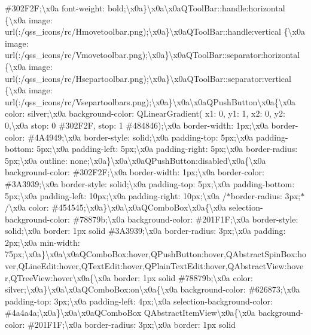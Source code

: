\#302\+F2\+F;\textbackslash{}x0a font-\/weight\+: bold;\textbackslash{}x0a\}\textbackslash{}x0a\textbackslash{}x0a\+Q\+Tool\+Bar\+::handle\+:horizontal \{\textbackslash{}x0a image\+: url(\+:/qss\+\_\+icons/rc/\+Hmovetoolbar.\+png);\textbackslash{}x0a\}\textbackslash{}x0a\+Q\+Tool\+Bar\+::handle\+:vertical \{\textbackslash{}x0a image\+: url(\+:/qss\+\_\+icons/rc/\+Vmovetoolbar.\+png);\textbackslash{}x0a\}\textbackslash{}x0a\+Q\+Tool\+Bar\+::separator\+:horizontal \{\textbackslash{}x0a image\+: url(\+:/qss\+\_\+icons/rc/\+Hsepartoolbar.\+png);\textbackslash{}x0a\}\textbackslash{}x0a\+Q\+Tool\+Bar\+::separator\+:vertical \{\textbackslash{}x0a image\+: url(\+:/qss\+\_\+icons/rc/\+Vsepartoolbars.\+png);\textbackslash{}x0a\}\textbackslash{}x0a\textbackslash{}x0a\+Q\+Push\+Button\textbackslash{}x0a\{\textbackslash{}x0a color\+: silver;\textbackslash{}x0a background-\/color\+: Q\+Linear\+Gradient( x1\+: 0, y1\+: 1, x2\+: 0, y2\+: 0,\textbackslash{}x0a stop\+: 0 \#302\+F2\+F, stop\+: 1 \#484846);\textbackslash{}x0a border-\/width\+: 1px;\textbackslash{}x0a border-\/color\+: \#4\+A4949;\textbackslash{}x0a border-\/style\+: solid;\textbackslash{}x0a padding-\/top\+: 5px;\textbackslash{}x0a padding-\/bottom\+: 5px;\textbackslash{}x0a padding-\/left\+: 5px;\textbackslash{}x0a padding-\/right\+: 5px;\textbackslash{}x0a border-\/radius\+: 5px;\textbackslash{}x0a outline\+: none;\textbackslash{}x0a\}\textbackslash{}x0a\textbackslash{}x0a\+Q\+Push\+Button\+:disabled\textbackslash{}x0a\{\textbackslash{}x0a background-\/color\+: \#302\+F2\+F;\textbackslash{}x0a border-\/width\+: 1px;\textbackslash{}x0a border-\/color\+: \#3\+A3939;\textbackslash{}x0a border-\/style\+: solid;\textbackslash{}x0a padding-\/top\+: 5px;\textbackslash{}x0a padding-\/bottom\+: 5px;\textbackslash{}x0a padding-\/left\+: 10px;\textbackslash{}x0a padding-\/right\+: 10px;\textbackslash{}x0a /$\ast$border-\/radius\+: 3px;$\ast$/\textbackslash{}x0a color\+: \#454545;\textbackslash{}x0a\}\textbackslash{}x0a\textbackslash{}x0a\+Q\+Combo\+Box\textbackslash{}x0a\{\textbackslash{}x0a selection-\/background-\/color\+: \#78879b;\textbackslash{}x0a background-\/color\+: \#201\+F1\+F;\textbackslash{}x0a border-\/style\+: solid;\textbackslash{}x0a border\+: 1px solid \#3\+A3939;\textbackslash{}x0a border-\/radius\+: 3px;\textbackslash{}x0a padding\+: 2px;\textbackslash{}x0a min-\/width\+: 75px;\textbackslash{}x0a\}\textbackslash{}x0a\textbackslash{}x0a\+Q\+Combo\+Box\+:hover,\+Q\+Push\+Button\+:hover,\+Q\+Abstract\+Spin\+Box\+:hover,\+Q\+Line\+Edit\+:hover,\+Q\+Text\+Edit\+:hover,\+Q\+Plain\+Text\+Edit\+:hover,\+Q\+Abstract\+View\+:hover,\+Q\+Tree\+View\+:hover\textbackslash{}x0a\{\textbackslash{}x0a border\+: 1px solid \#78879b;\textbackslash{}x0a color\+: silver;\textbackslash{}x0a\}\textbackslash{}x0a\textbackslash{}x0a\+Q\+Combo\+Box\+:on\textbackslash{}x0a\{\textbackslash{}x0a background-\/color\+: \#626873;\textbackslash{}x0a padding-\/top\+: 3px;\textbackslash{}x0a padding-\/left\+: 4px;\textbackslash{}x0a selection-\/background-\/color\+: \#4a4a4a;\textbackslash{}x0a\}\textbackslash{}x0a\textbackslash{}x0a\+Q\+Combo\+Box Q\+Abstract\+Item\+View\textbackslash{}x0a\{\textbackslash{}x0a background-\/color\+: \#201\+F1\+F;\textbackslash{}x0a border-\/radius\+: 3px;\textbackslash{}x0a border\+: 1px solid 